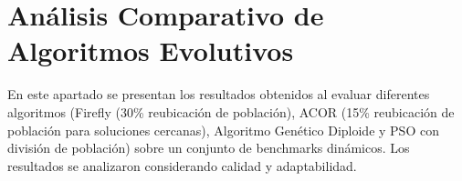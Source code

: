 \documentclass[10pt]{article}
\begin{document}
\section*{Análisis Comparativo de Algoritmos Evolutivos}

En este apartado se presentan los resultados obtenidos al evaluar diferentes algoritmos (Firefly (30\% reubicación de población), ACOR (15\% reubicación de población para soluciones cercanas), Algoritmo Genético Diploide y PSO con división de población) sobre un conjunto de benchmarks dinámicos. Los resultados se analizaron considerando calidad y adaptabilidad.




\end{document}
